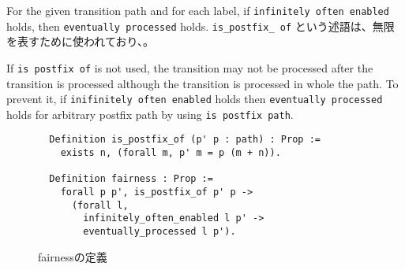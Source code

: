 For the given transition path and for each label, if \texttt{infinitely often enabled} holds, then \texttt{eventually processed} holds.
\texttt{is\_postfix\_ of} という述語は、無限を表すために使われており、。

If \texttt{is postfix of} is not used, the transition may not be processed after the transition is processed although the transition is processed in whole the path.
To prevent it, if \texttt{inifinitely often enabled} holds then \texttt{eventually processed} holds for arbitrary postfix path by using \texttt{is postfix path}.

\begin{figure}[tp]
  \begin{lstlisting}
  Definition is_postfix_of (p' p : path) : Prop :=
    exists n, (forall m, p' m = p (m + n)).

  Definition fairness : Prop :=
    forall p p', is_postfix_of p' p ->
      (forall l,
        infinitely_often_enabled l p' ->
        eventually_processed l p').
  \end{lstlisting}
  \label{code:formalization:fairness}
  \caption{fairnessの定義}
\end{figure}
